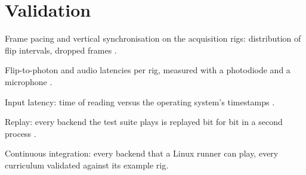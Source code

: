 \section{Validation}
\label{sec:validation}

\begin{outline}
  \item Frame pacing and vertical synchronisation on the acquisition rigs: distribution of flip intervals, dropped frames .
  \item Flip-to-photon and audio latencies per rig, measured with a photodiode and a microphone .
  \item Input latency: time of reading versus the operating system's timestamps .
  \item Replay: every backend the test suite plays is replayed bit for bit in a second process .
  \item Continuous integration: every backend that a Linux runner can play, every curriculum validated against its example rig.
\end{outline}
